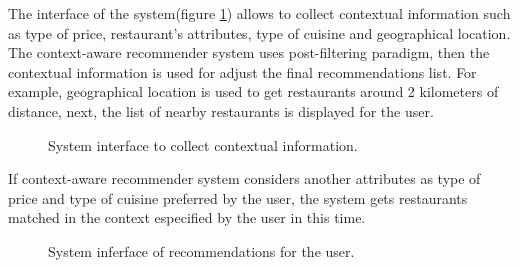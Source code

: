 The interface of the system(figure \ref{fig:context}) allows to
collect contextual information such as type of price, restaurant's
attributes, type of cuisine and geographical location. \\ 
The context-aware recommender system uses post-filtering paradigm, 
then the contextual information is used for adjust the final 
recommendations list. For example, geographical location is used 
to get restaurants around 2 kilometers of distance, next, 
the list of nearby restaurants is displayed for the user.\\  
\begin{figure}
\captionsetup{justification=centering,margin=2cm,font=footnotesize}
\centering
{}
\caption{System interface to collect contextual information.}
\label{fig:context}   
\end{figure}
If context-aware recommender system
considers another attributes as type of price and type of cuisine
preferred by the user, the system gets restaurants matched in the
context especified by the user in this time. 
\begin{figure}
\captionsetup{font=footnotesize}
\centering
{}
\caption{System inferface of recommendations for the user.}
\label{fig:recom}    
\end{figure}
